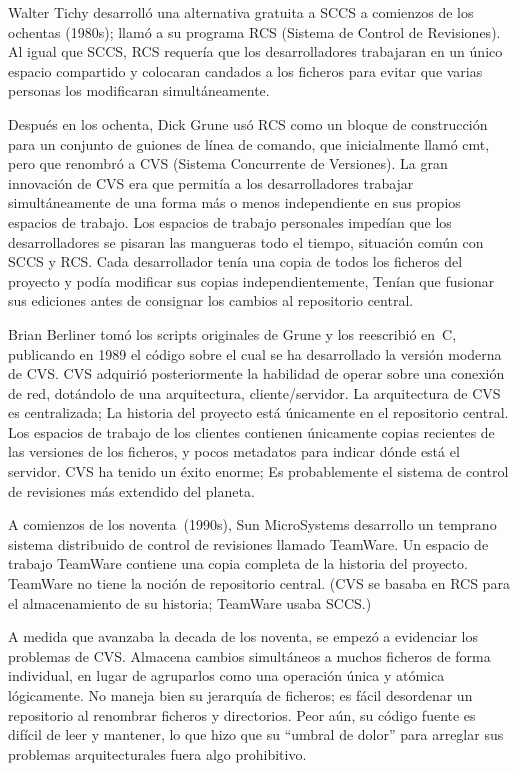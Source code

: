 Walter Tichy desarrolló una alternativa gratuita a SCCS a comienzos
de los ochentas (1980s); llamó a su programa RCS (Sistema de Control de
Revisiones).  Al igual que SCCS, RCS requería que los desarrolladores
trabajaran en un único espacio compartido y colocaran candados a los
ficheros para evitar que varias personas los modificaran
simultáneamente.

Después en los ochenta, Dick Grune usó RCS como un bloque de
construcción para un conjunto de guiones de línea de comando, que
inicialmente llamó cmt, pero que renombró a CVS (Sistema Concurrente de
Versiones).  La gran innovación de CVS era que permitía a los
desarrolladores trabajar simultáneamente de una forma más o menos
independiente en sus propios espacios de trabajo. Los espacios de
trabajo personales impedían que los desarrolladores se pisaran las
mangueras todo el tiempo, situación común con SCCS y RCS.  Cada
desarrollador tenía una copia de todos los ficheros del proyecto y podía
modificar sus copias independientemente, Tenían que fusionar sus
ediciones antes de consignar los cambios al repositorio central.

Brian Berliner tomó los scripts originales de Grune y los reescribió
en~C, publicando en 1989 el código sobre el cual se ha
desarrollado la versión moderna de CVS.  CVS adquirió posteriormente 
la habilidad de operar sobre una conexión de red, dotándolo de una
arquitectura, cliente/servidor. La arquitectura de CVS es
centralizada; La historia del proyecto está únicamente en el
repositorio central.  Los espacios de trabajo de los clientes
contienen únicamente copias recientes de las versiones de los
ficheros, y pocos metadatos para indicar dónde está el servidor. CVS
ha tenido un éxito enorme; Es probablemente el sistema de control de
revisiones más extendido del planeta.

A comienzos de los noventa~(1990s), Sun MicroSystems desarrollo un
temprano sistema distribuido de control de revisiones llamado
TeamWare.
Un espacio de trabajo TeamWare contiene una copia completa de la
historia del proyecto. TeamWare no tiene la noción de repositorio
central. (CVS se basaba en RCS para el almacenamiento de su historia;
TeamWare usaba SCCS.)

A medida que avanzaba la decada de los noventa, se empezó a
evidenciar los problemas de CVS.  Almacena cambios simultáneos a muchos
ficheros de forma individual, en lugar de agruparlos como una
operación única y atómica lógicamente.  No maneja bien su jerarquía de
ficheros; es fácil desordenar un repositorio al renombrar ficheros
y directorios. Peor aún, su código fuente es difícil de leer y
mantener, lo que hizo que su ``umbral de dolor'' para arreglar sus
problemas arquitecturales fuera algo prohibitivo.

